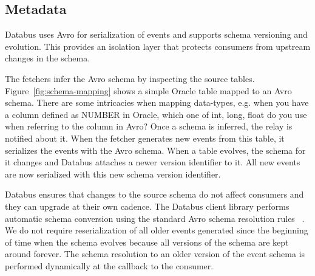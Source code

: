 \subsection{Metadata} 
\begin{figure*}
\centering
{}
\caption{Oracle table mapped to Avro schema}
\label{fig:schema-mapping}
\end{figure*}

Databus uses Avro for serialization of events and supports schema versioning and evolution. This provides an isolation layer that protects consumers from upstream changes in the schema.

The fetchers infer the Avro schema by inspecting the source tables. Figure~\ref{fig:schema-mapping} shows a simple Oracle table mapped to an Avro schema. There are some intricacies when mapping data-types, e.g. when you have a column defined as NUMBER in Oracle, which one of int, long, float do you use when referring to the column in Avro? Once a schema is inferred, the relay is notified about it. When the fetcher generates new events from this table, it serializes the events with the Avro schema. When a table evolves, the schema for it changes and Databus attaches a newer version identifier to it. All new events are now serialized with this new schema version identifier. 

Databus ensures that changes to the source schema do not affect consumers and they can upgrade at their own cadence. The Databus client library performs automatic schema conversion using the standard  Avro schema resolution rules~\cite{avro} . We do not require reserialization of all older events generated since the beginning of time when the schema evolves because all versions of the schema are kept around forever. The schema resolution to an older version of the event schema is performed dynamically at the callback to the consumer. 
